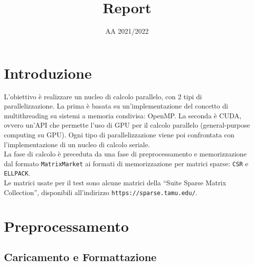 \documentclass[12pt,halfline,a4paper]{ouparticle}
\begin{document}
\title{Report}

\author{%
}


\date{AA 2021/2022}

\maketitle

\section{Introduzione}
\label{sec1}

L'obiettivo è realizzare un nucleo di calcolo parallelo, con 2 tipi di parallelizzazione.\break
La prima è basata su un'implementazione del concetto di multithreading su sistemi a memoria condivisa: OpenMP.
La seconda è CUDA, ovvero un'API che permette l'uso di GPU per il calcolo parallelo (general-purpose computing su GPU).
Ogni tipo di parallelizzazione viene poi confrontata con l'implementazione di un nucleo di calcolo seriale.\\
La fase di calcolo è preceduta da una fase di preprocessamento e memorizzazione dal formato \verb+MatrixMarket+ ai formati di memorizzazione per matrici sparse: \verb+CSR+ e \verb+ELLPACK+.\\
Le matrici usate per il test sono alcune matrici della “Suite Sparse Matrix Collection”, disponibili all'indirizzo \verb+https://sparse.tamu.edu/+.


\section{Preprocessamento}
\label{sec2}
\subsection{Caricamento e Formattazione}
\label{sec2.1}
\end{document}
